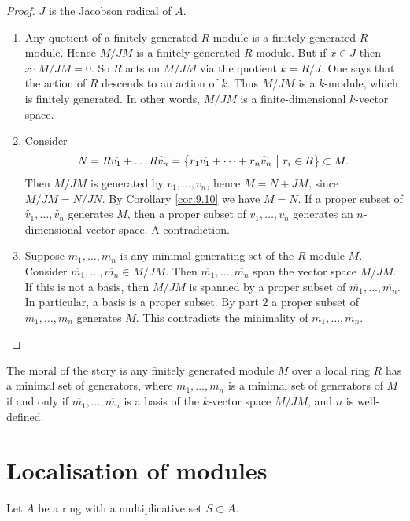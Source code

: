 \begin{proof}
$ J $ is the Jacobson radical of $ A $.
\begin{enumerate}
\item Any quotient of a finitely generated $ R $-module is a finitely generated $ R $-module. Hence $ M / JM $ is a finitely generated $ R $-module. But if $ x \in J $ then $ x \cdot M / JM = 0 $. So $ R $ acts on $ M / JM $ via the quotient $ k = R / J $. One says that the action of $ R $ descends to an action of $ k $. Thus $ M / JM $ is a $ k $-module, which is finitely generated. In other words, $ M / JM $ is a finite-dimensional $ k $-vector space.
\item Consider
$$ N = R\widetilde{v_1} + \dots R\widetilde{v_n} = \cbr{r_1\widetilde{v_1} + \dots + r_n\widetilde{v_n} \st r_i \in R} \subset M. $$
Then $ M / JM $ is generated by $ v_1, \dots, v_n $, hence $ M = N + JM $, since $ M / JM = N / JN $. By Corollary \ref{cor:9.10} we have $ M = N $. If a proper subset of $ \widetilde{v_1}, \dots, \widetilde{v_n} $ generates $ M $, then a proper subset of $ v_1, \dots, v_n $ generates an $ n $-dimensional vector space. A contradiction.


\item Suppose $ m_1, \dots, m_n $ is any minimal generating set of the $ R $-module $ M $. Consider $ \overline{m_1}, \dots, \overline{m_n} \in M / JM $. Then $ \overline{m_1}, \dots, \overline{m_n} $ span the vector space $ M / JM $. If this is not a basis, then $ M / JM $ is spanned by a proper subset of $ \overline{m_1}, \dots, \overline{m_n} $. In particular, a basis is a proper subset. By part $ 2 $ a proper subset of $ m_1, \dots, m_n $ generates $ M $. This contradicts the minimality of $ m_1, \dots, m_n $.
\end{enumerate}
\end{proof}

The moral of the story is any finitely generated module $ M $ over a local ring $ R $ has a minimal set of generators, where $ m_1, \dots, m_n $ is a minimal set of generators of $ M $ if and only if $ \overline{m_1}, \dots, \overline{m_n} $ is a basis of the $ k $-vector space $ M / JM $, and $ n $ is well-defined.

\section{Localisation of modules}

Let $ A $ be a ring with a multiplicative set $ S \subset A $.


